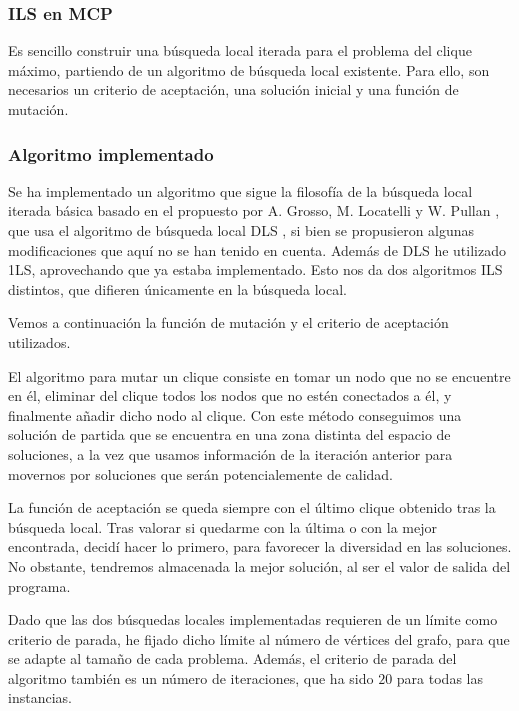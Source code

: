 \subsubsection{ILS en MCP}

Es sencillo construir una búsqueda local iterada para el problema del clique máximo,
partiendo de un algoritmo de búsqueda local existente. Para ello, son necesarios un
criterio de aceptación, una solución inicial y una función de mutación.

\subsubsection{Algoritmo implementado}

Se ha implementado un algoritmo que sigue la filosofía de la búsqueda local iterada
básica basado en el propuesto por A. Grosso, M. Locatelli y W. Pullan \citep{grosso:2008},
que usa el algoritmo de búsqueda local DLS \citep{pullan:2006}, si bien se propusieron
algunas modificaciones que aquí no se han tenido en cuenta. Además de DLS he utilizado
1LS, aprovechando que ya estaba implementado. Esto nos da dos algoritmos ILS distintos,
que difieren únicamente en la búsqueda local.

Vemos a continuación la función de mutación y el criterio de aceptación utilizados.

El algoritmo para mutar un clique consiste en tomar un nodo que no se encuentre en él,
eliminar del clique todos los nodos que no estén conectados a él, y finalmente añadir
dicho nodo al clique. Con este método conseguimos una solución de partida que se encuentra
en una zona distinta del espacio de soluciones, a la vez que usamos información de la
iteración anterior para movernos por soluciones que serán potencialemente de calidad.

La función de aceptación se queda siempre con el último clique obtenido tras la búsqueda local.
Tras valorar si quedarme con la última o con la mejor encontrada, decidí hacer lo primero,
para favorecer la diversidad en las soluciones. No obstante, tendremos almacenada la mejor
solución, al ser el valor de salida del programa.

Dado que las dos búsquedas locales implementadas requieren de un límite como criterio de
parada, he fijado dicho límite al número de vértices del grafo, para que se adapte al
tamaño de cada problema. Además, el criterio de parada del algoritmo también es un número
de iteraciones, que ha sido $20$ para todas las instancias.

